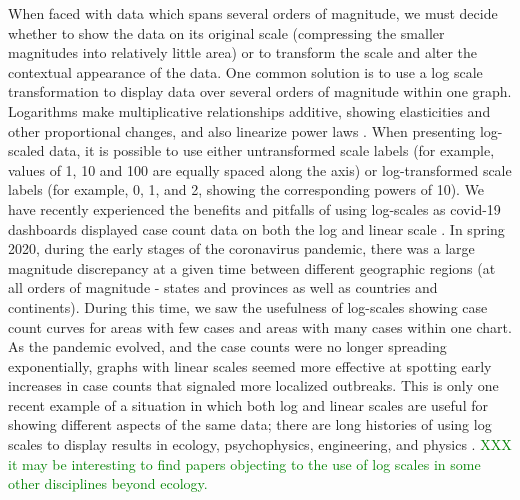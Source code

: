 \documentclass[]{interact}
\theoremstyle{plain}%
\theoremstyle{definition}
\theoremstyle{remark}
\begin{document}
When faced with data which spans several orders of magnitude, we must
decide whether to show the data on its original scale (compressing the
smaller magnitudes into relatively little area) or to transform the
scale and alter the contextual appearance of the data. One common
solution is to use a log scale transformation to display data over
several orders of magnitude within one graph. Logarithms make
multiplicative relationships additive, showing elasticities and other
proportional changes, and also linearize power laws
\citep{menge_logarithmic_2018}. When presenting log-scaled data, it is
possible to use either untransformed scale labels (for example, values
of 1, 10 and 100 are equally spaced along the axis) or log-transformed
scale labels (for example, 0, 1, and 2, showing the corresponding powers
of 10). We have recently experienced the benefits and pitfalls of using
log-scales as covid-19 dashboards displayed case count data on both the
log and linear scale
\textcolor{Plum}{\citep{wade_fagen_ulmschneider_2020, financial_times_2020}}.
In spring 2020, during the early stages of the coronavirus pandemic,
there was a large magnitude discrepancy at a given time between
different geographic regions (at all orders of magnitude - states and
provinces as well as countries and continents). During this time, we saw
the usefulness of log-scales showing case count curves for areas with
few cases and areas with many cases within one chart. As the pandemic
evolved, and the case counts were no longer spreading exponentially,
graphs with linear scales seemed more effective at spotting early
increases in case counts that signaled more localized outbreaks. This is
only one recent example of a situation in which both log and linear
scales are useful for showing different aspects of the same data; there
are long histories of using log scales to display results in ecology,
psychophysics, engineering, and physics
\citep{xkcd, menge_logarithmic_2018}.
\textcolor{Green}{XXX it may be interesting to find papers objecting to the use of log scales in some other disciplines beyond ecology.}
\end{document}
